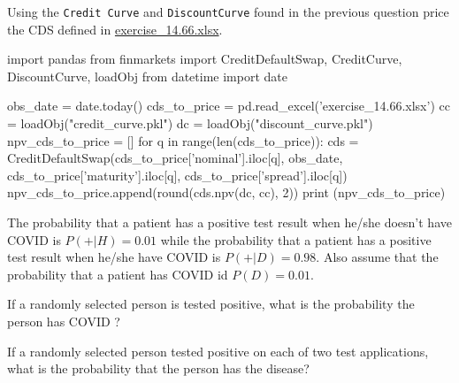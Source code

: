 \cprotEnv\begin{question}
Using the \texttt{Credit\ Curve} and \texttt{DiscountCurve} found in the previous question price the CDS defined in \href{https://github.com/matteosan1/finance_course/raw/master/input_files/exercise_14.66.xlsx}{exercise\_14.66.xlsx}.
\end{question}

\cprotEnv\begin{solution}
\begin{ipython}
import pandas
from finmarkets import CreditDefaultSwap, CreditCurve, DiscountCurve, loadObj
from datetime import date

obs_date = date.today()
cds_to_price = pd.read_excel('exercise_14.66.xlsx')
cc = loadObj("credit_curve.pkl")
dc = loadObj("discount_curve.pkl")
npv_cds_to_price = []
for q in range(len(cds_to_price)):
    cds = CreditDefaultSwap(cds_to_price['nominal'].iloc[q], 
                            obs_date,
                            cds_to_price['maturity'].iloc[q], 
                            cds_to_price['spread'].iloc[q])
    npv_cds_to_price.append(round(cds.npv(dc, cc), 2))
print (npv_cds_to_price)
\end{ipython}
\begin{ioutput}
[-116830.83, -137319.91, -158270.54, 
-162685.25, -217167.88, -238611.07, 
-313501.27, -326567.29, -298467.30]
\end{ioutput}
\end{solution}

\begin{question}
The probability that a patient has a positive test result when he/she doesn't have COVID is $P(+|H)=0.01$ while the probability that a patient has a positive test result when he/she have COVID is $P(+|D)=0.98$. Also assume that the probability that a patient has COVID id $P(D)=0.01$. 

If a randomly selected person is tested positive, what is the probability the person has COVID ?

If a randomly selected person tested positive on each of two test applications, what is the probability that the person has the disease?
\end{question}

